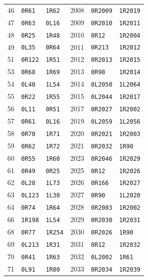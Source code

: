 \begin{longtable}{@{}rll@{\hspace{1.2cm}}rll@{}}
46 & \texttt{0R61} & \texttt{1R62} & 2008 & \texttt{0R2009} & \texttt{1R2019}\\
47 & \texttt{0R63} & \texttt{0L16} & 2009 & \texttt{0R2010} & \texttt{1R2011}\\
48 & \texttt{0R25} & \texttt{1R48} & 2010 & \texttt{0R12} & \texttt{1R2004}\\
49 & \texttt{0L35} & \texttt{0R64} & 2011 & \texttt{0R213} & \texttt{1R2012}\\
51 & \texttt{0R122} & \texttt{1R51} & 2012 & \texttt{0R2013} & \texttt{1R2015}\\
53 & \texttt{0R68} & \texttt{1R69} & 2013 & \texttt{0R98} & \texttt{1R2014}\\
54 & \texttt{0L40} & \texttt{1L54} & 2014 & \texttt{0L2050} & \texttt{1L2064}\\
55 & \texttt{0R22} & \texttt{1R55} & 2015 & \texttt{0L2044} & \texttt{1R2017}\\
56 & \texttt{0L11} & \texttt{0R51} & 2017 & \texttt{0R2027} & \texttt{1R2002}\\
57 & \texttt{0R61} & \texttt{0L16} & 2019 & \texttt{0L2059} & \texttt{1L2056}\\
58 & \texttt{0R70} & \texttt{1R71} & 2020 & \texttt{0R2021} & \texttt{1R2003}\\
59 & \texttt{0R62} & \texttt{1R72} & 2021 & \texttt{0R2032} & \texttt{1R90}\\
60 & \texttt{0R55} & \texttt{1R60} & 2023 & \texttt{0R2046} & \texttt{1R2029}\\
61 & \texttt{0R49} & \texttt{0R25} & 2025 & \texttt{0R12} & \texttt{1R2026}\\
62 & \texttt{0L28} & \texttt{1L73} & 2026 & \texttt{0R166} & \texttt{1R2027}\\
63 & \texttt{0L123} & \texttt{1L30} & 2027 & \texttt{0R90} & \texttt{1L2020}\\
64 & \texttt{0R74} & \texttt{1R64} & 2028 & \texttt{0R2003} & \texttt{1R2002}\\
66 & \texttt{1R198} & \texttt{1L54} & 2029 & \texttt{0R2030} & \texttt{1R2031}\\
68 & \texttt{0R77} & \texttt{1R254} & 2030 & \texttt{0R2026} & \texttt{1R90}\\
69 & \texttt{0L213} & \texttt{1R31} & 2031 & \texttt{0R12} & \texttt{1R2032}\\
70 & \texttt{0R41} & \texttt{1R63} & 2032 & \texttt{0L2002} & \texttt{1R61}\\
71 & \texttt{0L91} & \texttt{1R80} & 2033 & \texttt{0R2034} & \texttt{1R2039}\\

\end{longtable}
